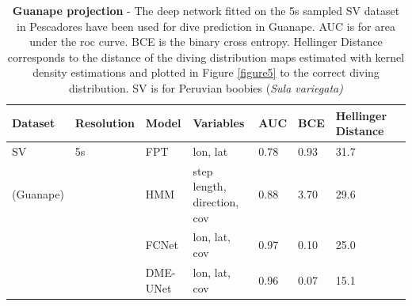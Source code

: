 \documentclass{article}
\begin{document}
\begin{table}[h]
 \caption{\textbf{Guanape projection} - The deep network fitted on the 5s sampled SV dataset in Pescadores have been used for dive prediction in Guanape. AUC is for area under the roc curve. BCE is the binary cross entropy. Hellinger Distance corresponds to the distance of the diving distribution maps estimated with kernel density estimations and plotted in Figure \ref{figure5} to the correct diving distribution. SV is for Peruvian boobies (\textit{Sula variegata)}}
  \centering
  \begin{tabular}{llllllll}
    \toprule
    Dataset  &  Resolution &  Model & Variables & AUC & BCE & Hellinger Distance \\
    \midrule
    SV      & 5s  & FPT    & lon, lat               & 0.78 & 0.93 & 31.7          \\
  (Guanape) &     & HMM    & step length, direction, cov & 0.88 & 3.70 & 29.6     \\
            &     & FCNet  & lon, lat, cov  & 0.97 & 0.10 & 25.0                  \\
            &     & DME-UNet   & lon, lat, cov  & 0.96 & 0.07 & 15.1              \\
    \bottomrule
  \end{tabular}
  \label{table3}
\end{table}
\end{document}
